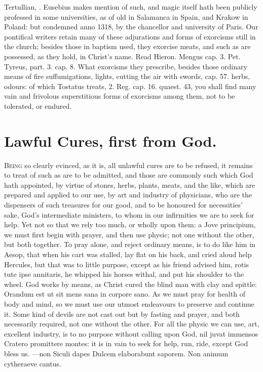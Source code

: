 {Tertullian, \Austin{}. Eusebius makes mention of such, and magic itself
hath been publicly professed in some universities, as of old in
Salamanca in Spain, and Krakow in Poland: but condemned anno 1318, by
the chancellor and university of Paris. Our pontifical writers
retain many of these adjurations and forms of exorcisms still in the
church; besides those in baptism used, they exorcise meats, and such as
are possessed, as they hold, in Christ's name. Read Hieron. Mengus cap.
3. Pet. Tyreus, part. 3. cap. 8. What exorcisms they prescribe, besides
those ordinary means of fire suffumigations, lights, cutting the
air with swords, cap. 57. herbs, odours: of which Tostatus treats, 2.
Reg. cap. 16. quaest. 43, you shall find many vain and frivolous
superstitious forms of exorcisms among them, not to be tolerated, or
endured.


\section{Lawful Cures, first from God.}

\lettrine{B}{eing} so clearly evinced, as it is, all unlawful cures are to be
refused, it remains to treat of such as are to be admitted, and those
are commonly such which God hath appointed, by virtue of stones,
herbs, plants, meats, and the like, which are prepared and applied to
our use, by art and industry of physicians, who are the dispensers of
such treasures for our good, and to be honoured for necessities'
sake, God's intermediate ministers, to whom in our infirmities we are
to seek for help. Yet not so that we rely too much, or wholly upon
them: a Jove principium, we must first begin with prayer, and
then use physic; not one without the other, but both together. To pray
alone, and reject ordinary means, is to do like him in Aesop, that when
his cart was stalled, lay flat on his back, and cried aloud help
Hercules, but that was to little purpose, except as his friend advised
him, rotis tute ipse annitaris, he whipped his horses withal, and put
his shoulder to the wheel. God works by means, as Christ cured the
blind man with clay and spittle: Orandum est ut sit mens sana in
corpore sano. As we must pray for health of body and mind, so we must
use our utmost endeavours to preserve and continue it. Some kind of
devils are not cast out but by fasting and prayer, and both necessarily
required, not one without the other. For all the physic we can use,
art, excellent industry, is to no purpose without calling upon God, nil
juvat immensos Cratero promittere montes: it is in vain to seek for
help, run, ride, except God bless us.
---non Siculi dapes
Dulcem elaborabunt saporem.
Non animum cytheraeve cantus.

}
